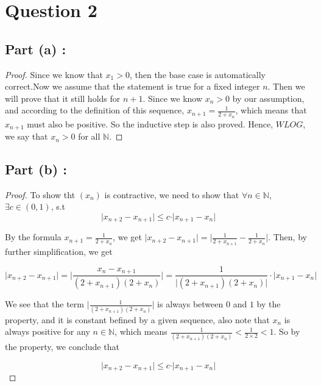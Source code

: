 \documentclass[12pt]{article}
\begin{document}
\newpage
\section*{Question 2}

\subsection*{Part (a) :}
\begin{proof}
Since we know that $x_1 > 0$, then the base case is 
automatically correct.Now we assume that the statement
is true for a fixed integer $n$. Then we will prove that
it still holds for $n+1$. Since we know $x_n >0$ by our
assumption, and according to the definition of this
sequence, $x_{n+1} = \displaystyle{\frac{1}{2 + x_n}}$,
which means that $x_{n+1}$ must also be positive. So
the inductive step is also proved. Hence, 
$\textit{WLOG}$, we say that $x_n > 0$ for all $\mathbb{N}$.
\end{proof}

\subsection*{Part (b) :}
\begin{proof}
To show tht $(x_n)$ is contractive, we need to show that
$\forall n \in \mathbb{N}$, $\exists c \in (0,1)$, s.t
\[ \vert x_{n+2} - x_{n+1} \vert \leq c\cdot
\vert x_{n+1} - x_n \vert \]

By the formula $x_{n+1} = \displaystyle{\frac{1}{2+x_n}}$,
we get $\vert x_{n+2} - x_{n+1} \vert = 
\Bigg| \displaystyle{\frac{1}{2+x_{n+1}} - \frac{1}{2+x_n}}
\Bigg| $. Then, by further simplification, we get

\[\vert x_{n+2} - x_{n+1} \vert = 
\Bigg| \displaystyle{\frac{x_n - x_{n+1}}{(2+x_{n+1})(2+x_n)}
\Bigg| = \frac{1}{\vert (2+x_{n+1})(2+x_n)\vert } \cdot
\big| x_{n+1} - x_n \big| }\]

We see that the term $ 
\Bigg| \displaystyle{\frac{1}{(2+x_{n+1})(2+x_n)}
\Bigg|}$ is always between $0$ and $1$ by the property, and
it is constant befined by a given sequence, also note that
$x_n$ is always positive for any $n \in \mathbb{N}$, which
means $\displaystyle{\frac{1}{(2+x_{n+1})(2+x_n)}} < 
\frac{1}{2\times 2} < 1$. So by the property, we conclude that

\[ \vert x_{n+2} - x_{n+1} \vert \leq c\cdot
\vert x_{n+1} - x_n \vert \]
\end{proof}
\end{document}
